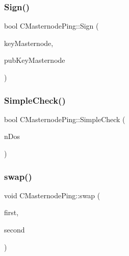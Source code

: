 \mbox{\label{class_c_masternode_ping_afa3eb82ae9457cc135089d83ae7719ea}} 
\subsubsection{\texorpdfstring{Sign()}{Sign()}}
{\footnotesize\ttfamily bool C\+Masternode\+Ping\+::\+Sign (\begin{DoxyParamCaption}\item[{\mbox{\hyperlink{class_c_key}{C\+Key}} \&}]{key\+Masternode,  }\item[{\mbox{\hyperlink{class_c_pub_key}{C\+Pub\+Key}} \&}]{pub\+Key\+Masternode }\end{DoxyParamCaption})}

\mbox{\label{class_c_masternode_ping_a6a3869dbd3431cb5f4243726e3103f4e}} 
\subsubsection{\texorpdfstring{Simple\+Check()}{SimpleCheck()}}
{\footnotesize\ttfamily bool C\+Masternode\+Ping\+::\+Simple\+Check (\begin{DoxyParamCaption}\item[{int \&}]{n\+Dos }\end{DoxyParamCaption})}

\mbox{\label{class_c_masternode_ping_afa95b89b426ef3b83ccc5b3f30faa3bd}} 
\subsubsection{\texorpdfstring{swap()}{swap()}}
{\footnotesize\ttfamily void C\+Masternode\+Ping\+::swap (\begin{DoxyParamCaption}\item[{\mbox{\hyperlink{class_c_masternode_ping}{C\+Masternode\+Ping}} \&}]{first,  }\item[{\mbox{\hyperlink{class_c_masternode_ping}{C\+Masternode\+Ping}} \&}]{second }\end{DoxyParamCaption})\hspace{0.3cm}{\ttfamily [inline]}}



